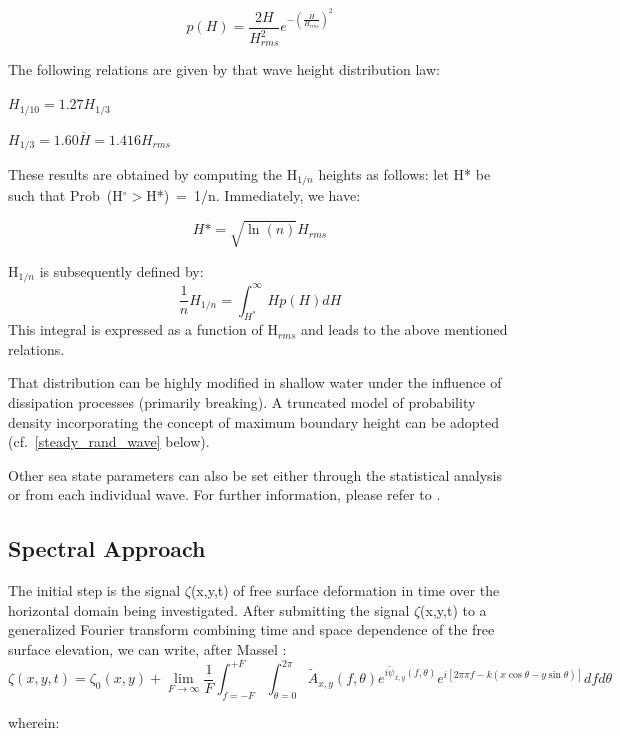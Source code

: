 \begin{equation}
  p(H) = \frac{2H}{H_{rms}^{2}}e^{-\left(\frac{H}{H_{rms}}\right)^{2}}
\end{equation}

The following relations are given by that wave height distribution law:

$H_{1/10} = 1.27 H_{1/3}$

$H_{1/3} = 1.60 \overline{H} = 1.416 H_{rms}$


These results are obtained by computing the H${}_{1/n}$ heights as follows: let H*
be such that Prob~(H${}^\circ >$H*)~=~1/n. Immediately, we
have:

$$H* = \sqrt{\ln(n)}H_{rms} $$

H${}_{1/n}$ is subsequently defined by:
\[\frac{1}{n}H_{1/n}=\int^{\infty }_{H^*}{Hp\left(H\right)dH}\]
This integral is expressed as a function of H${}_{rms}$ and leads to the above
mentioned relations.

That distribution can be highly modified in shallow water under the influence
of dissipation processes (primarily breaking). A truncated model of probability
density incorporating the concept of maximum boundary height can be adopted
(cf.~\ref{steady_rand_wave} below).

Other sea state parameters can also be set either through the statistical
analysis or from each individual wave. For further information, please refer to
\cite{SeaState}.


\subsection{Spectral Approach}\label{spectral_appr}

The initial step is the signal $\zeta$(x,y,t) of free surface deformation in
time over the horizontal domain being investigated. After submitting the signal
$\zeta$(x,y,t) to a generalized Fourier transform combining time and space
dependence of the free surface elevation, we can write, after Massel
\cite{Massel1996}:
\begin{equation}
  \zeta(x,y,t) = \zeta_{0}(x,y) + \lim_{F\rightarrow\infty}\frac{1}{F}\int_{f=-F}^{+F}\int_{\theta=0}^{2\pi}
         \tilde{A}_{x,y}(f,\theta)
         e^{i\tilde{\psi}_{x,y}(f,\theta)}
         e^{i[2\pi\pi{f}-k(x \cos \theta - y \sin \theta )]}d{f}d{\theta}
\end{equation}

wherein:

